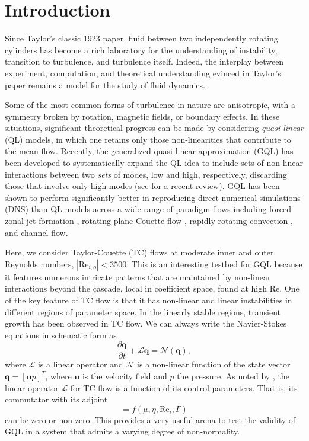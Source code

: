 \documentclass[openacc]{rstransa}%
\newcommand{\Reyn}{\mathrm{Re}}
\newcommand{\Lop}{\mathcal{L}}
\begin{document}
\section{Introduction}
\label{sec:intro}
Since Taylor's classic 1923 paper\cite{1923RSPTA.223..289T}, fluid between two independently rotating cylinders has become a rich laboratory for the understanding of instability, transition to turbulence, and turbulence itself. Indeed, the interplay between experiment, computation, and theoretical understanding evinced in Taylor's paper remains a model for the study of fluid dynamics.

Some of the most common forms of turbulence in nature are anisotropic, with a symmetry broken by rotation, magnetic fields, or boundary effects. In these situations, significant theoretical progress can be made by considering \emph{quasi-linear} (QL) models, in which one retains only those non-linearities that contribute to the mean flow. Recently, the generalized quasi-linear approximation (GQL) has been developed to systematically expand the QL idea to include sets of non-linear interactions between two \emph{sets} of modes, low and high, respectively, discarding those that involve only high modes (see \cite{2022arXiv220505513M} for a recent review). GQL has been shown to perform significantly better in reproducing direct numerical simulations (DNS) than QL models across a wide range of paradigm flows including forced zonal jet formation \cite{2016PhRvL.116u4501M}, rotating plane Couette flow \cite{2017JFM...810..412T}, rapidly rotating convection \cite{2018RSPSA.47480422T}, and channel flow\cite{2019Kellam}.

Here, we consider Taylor-Couette (TC) flows at moderate inner and outer Reynolds numbers, $|\Reyn_{i,o}| < 3500$. This is an interesting testbed for GQL because it features numerous intricate patterns that are maintained by non-linear interactions beyond the cascade, local in coefficient space, found at high $\Reyn$. 
One of the key feature of TC flow is that it has non-linear and linear instabilities in different regions of parameter space. In the linearly stable regions, transient growth has been observed in TC flow\cite{2002PhFl...14.3475H, 2002PhFl...14.1655M}. 
We can always write the Navier-Stokes equations in schematic form as
\begin{equation}
    \label{eqn:NS-schematic}
    \frac{\partial \mathbf{q}}{\partial t} + \Lop \mathbf{q} = \mathcal{N}(\mathbf{q}),
\end{equation}
where $\Lop$ is a linear operator and $\mathcal{N}$ is a non-linear function of the state vector $\mathbf{q} = \left[ \mathbf{u}  p\right]^T$, where $\mathbf{u}$ is the velocity field and $p$ the pressure.
As noted by \cite{2002PhFl...14.3475H}, the linear operator $\Lop$ for TC flow is a function of its control parameters.
That is, its commutator with its adjoint
\begin{equation}
    [\Lop^\dagger, \Lop] = f(\mu, \eta, \Reyn_i, \Gamma)
\end{equation}
can be zero or non-zero. 
This provides a very useful arena to test the validity of GQL in a system that admits a varying degree of non-normality.
\end{document}
